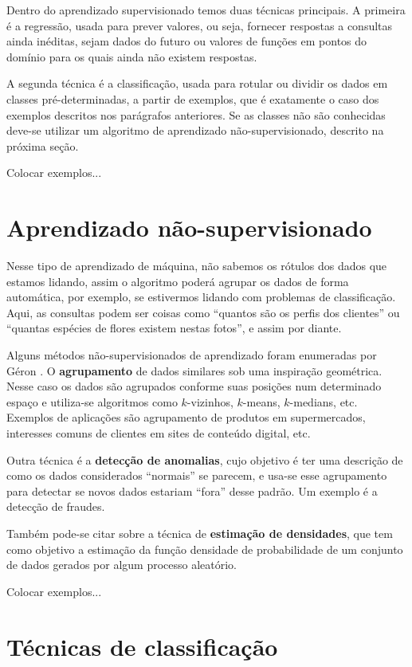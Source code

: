 Dentro do aprendizado supervisionado temos duas técnicas principais. A primeira é a regressão, usada para prever valores, ou seja, fornecer respostas a consultas ainda inéditas, sejam dados do futuro ou valores de funções em pontos do domínio para os quais ainda não existem respostas. 

A segunda técnica é a classificação, usada para rotular ou dividir os dados em classes pré-determinadas, a partir de exemplos, que é exatamente o caso dos exemplos descritos nos parágrafos anteriores. Se as classes não são conhecidas deve-se utilizar um algoritmo de aprendizado não-supervisionado, descrito na próxima seção. 

Colocar exemplos...

\section{Aprendizado não-supervisionado}

Nesse tipo de aprendizado de máquina, não sabemos os rótulos dos dados que estamos lidando, assim o algoritmo poderá agrupar os dados de forma automática, por exemplo, se estivermos lidando com problemas de classificação. Aqui, as consultas podem ser coisas como ``quantos são os perfis dos clientes'' ou ``quantas espécies de flores existem nestas fotos'', e assim por diante.

Alguns métodos não-supervisionados de aprendizado foram enumeradas por Géron \citep{hands}. O \textbf{agrupamento} de dados similares sob uma inspiração geométrica. Nesse caso os dados são agrupados conforme suas posições num determinado espaço e utiliza-se algoritmos como $k$-vizinhos, $k$-means, $k$-medians, etc. Exemplos de aplicações são agrupamento de produtos em supermercados, interesses comuns de clientes em sites de conteúdo digital, etc.

Outra técnica é a \textbf{detecção de anomalias}, cujo objetivo é ter uma descrição de como os dados considerados ``normais'' se parecem, e usa-se esse agrupamento para detectar se novos dados estariam ``fora'' desse padrão. Um exemplo é a detecção de fraudes.

Também pode-se citar sobre a técnica de \textbf{estimação de densidades}, que tem como objetivo a estimação da função densidade de probabilidade de um conjunto de dados gerados por algum processo aleatório.

Colocar exemplos...

\section{Técnicas de classificação}

